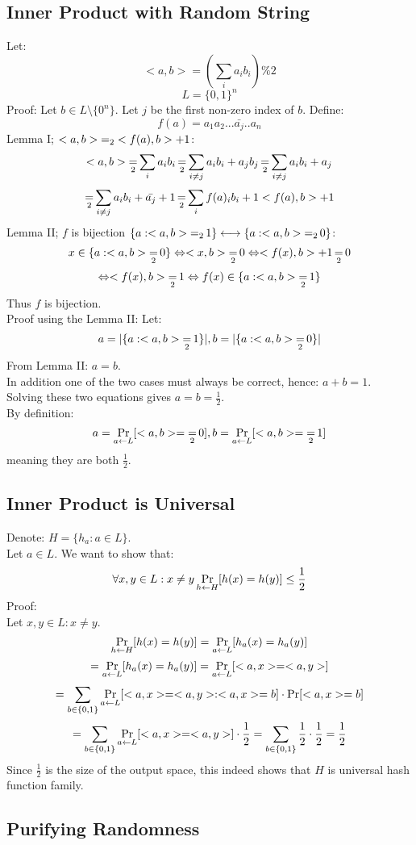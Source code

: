 
\subsection{Inner Product with Random String}
Let:
\[
	<a,b>=(\sum_ia_ib_i)\%2
\]\[
	L=\{0,1\}^n
\]
Proof:
Let $b\in L\setminus\{0^n\}$. Let $j$ be the first non-zero index of $b$. Define:
\[
	f(a)=a_1a_2...\bar{a_j}..a_n	
\]
Lemma I; $<a,b>\operatorname*{=}_2 <f(a),b>+1$:
\[
	<a,b>\operatorname*{=}_2\sum_ia_ib_i\operatorname*{=}_2 \sum_{i\neq j}a_ib_i+a_jb_j
	\operatorname*{=}_2 \sum_{i\neq j}a_ib_i+a_j
\]\[
	\operatorname*{=}_2 \sum_{i\neq j}a_ib_i+\bar{a_j}+1
	\operatorname*{=}_2 \sum_if(a)_ib_i+1
	<f(a),b>+1
\]
Lemma II; $f$ is bijection $\{a:<a,b>\operatorname*{=}_21\}\longleftrightarrow\{a:<a,b>\operatorname*{=}_20\}$:\\
\[
	x\in\{a:<a,b>\operatorname*{=}_20\}\Leftrightarrow 
	<x,b>\operatorname*{=}_20\Leftrightarrow 
	<f(x),b>+1\operatorname*{=}_20 
\]\[
	\Leftrightarrow
	<f(x),b>\operatorname*{=}_21\Leftrightarrow 
	f(x)\in\{a:<a,b>\operatorname*{=}_21\}
\]
Thus $f$ is bijection.\\
Proof using the Lemma II: Let:
\[
	a=|\{a:<a,b>\operatorname*{=}_21\}|,
	b=|\{a:<a,b>\operatorname*{=}_20\}|
\]
From Lemma II: $a=b$.\\
In addition one of the two cases must always be correct, hence: $a+b=1$.\\
Solving these two equations gives $a=b=\frac{1}{2}$.\\
By definition:
\[
	a=\operatorname*{Pr}_{a\leftarrow L}[<a,b>=\operatorname*{=}_2 0],
	b=\operatorname*{Pr}_{a\leftarrow L}[<a,b>=\operatorname*{=}_2 1]	
\]
meaning they are both $\frac{1}{2}$.

\subsection{Inner Product is Universal}
Denote: $H=\{h_a:a\in L\}$.\\
Let $a\in L$.
We want to show that:
\[
	\forall x,y\in L:x\neq y
	\operatorname*{Pr}_{h\leftarrow H}[h(x)=h(y)]\leq \frac{1}{2}
\]
Proof:\\
Let $x,y\in L:x\neq y$.
\[
	\operatorname*{Pr}_{h\leftarrow H}[h(x)=h(y)]=
	\operatorname*{Pr}_{a\leftarrow L}[h_a(x)=h_a(y)]
\]\[
	=\operatorname*{Pr}_{a\leftarrow L}[h_a(x)=h_a(y)]
	=\operatorname*{Pr}_{a\leftarrow L}[<a,x>=<a,y>]
\]\[
	=\sum_{b\in\{0,1\}}\operatorname*{Pr}_{a\leftarrow L}[<a,x>=<a,y>:<a,x>=b]\cdot\operatorname*{Pr}[<a,x>=b]	
\]\[
	=\sum_{b\in\{0,1\}}\operatorname*{Pr}_{a\leftarrow L}[<a,x>=<a,y>]\cdot\frac{1}{2}	
	=\sum_{b\in\{0,1\}}\frac{1}{2}\cdot\frac{1}{2}
	=\frac{1}{2}
\]
Since $\frac{1}{2}$ is the size of the output space, this indeed shows that $H$ is
universal hash function family.

\subsection{Purifying Randomness}

